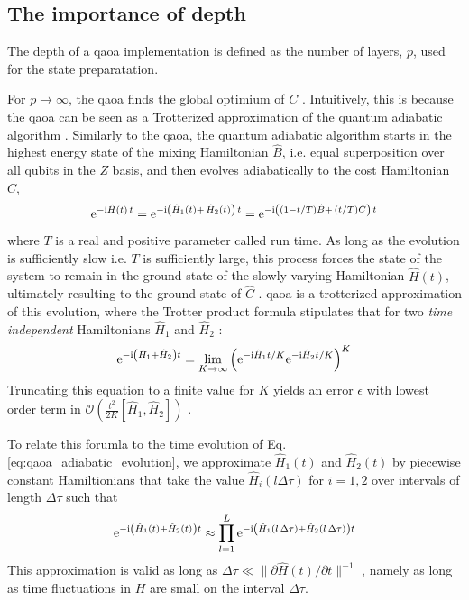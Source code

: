 \subsection{The importance of depth}
The depth of a \gls{qaoa} implementation is defined as the number of layers, $p$, used for the state preparatation.

For $p \rightarrow \infty$, the \gls{qaoa} finds the global optimium of $C$ \cite{Farhi2014AAlgorithm}. Intuitively, this is because the \gls{qaoa} can be seen as a Trotterized approximation \cite{TrotterMathematics} of the quantum adiabatic algorithm \cite{Farhi2000QuantumEvolution}. Similarly to the \gls{qaoa}, the quantum adiabatic algorithm starts in the highest energy state of the mixing Hamiltonian $\hat B$, i.e. equal superposition over all qubits in the $Z$ basis, and then evolves adiabatically to the cost Hamiltonian $\hat C$,
\begin{equation} \label{eq:qaoa_adiabatic_evolution}
\mathrm e^{-\mathrm i \hat H(t)\,t}= \mathrm e^{-\mathrm i \left(\hat H_1(t) +\, \hat H_2(t)\right) \, t} = \mathrm e^{-\mathrm i \left((1-t / T) \hat B+ \, (t / T) \hat C\right)\, t}
\end{equation}
where $T$ is a real and positive parameter called run time. As long as the evolution is sufficiently slow i.e. $T$ is sufficiently large, this process forces the state of the system to remain in the ground state of the slowly varying Hamiltonian $\hat H(t)$, ultimately resulting to the ground state of $\hat C$ \cite{Farhi2000QuantumEvolution, Farhi2014AAlgorithm}. \gls{qaoa} is a trotterized approximation of this evolution, where the Trotter product formula stipulates that for two \textit{time independent} Hamiltonians $\hat H_1$ and $\hat H_2$ \cite{TrotterMathematics}:
\begin{equation} \label{eq:qaoa_product_formula}
    \mathrm e^{-\mathrm i\left(\hat H_{1} + \hat H_{2}\right) t}=\lim _{K \rightarrow \infty}\left(\mathrm e^{-\mathrm i \hat H_{1} t / K} \mathrm e^{-\mathrm i \hat H_{2} t / K}\right)^{K}
\end{equation}
Truncating this equation to a finite value for  $K$ yields an error $\epsilon$ with lowest order term in $\mathcal{O}\left(\frac{t^2}{2K} [\hat H_1, \hat H_2]\right)$ \cite{Heyl2018QuantumSimulation, Lloyd1996UniversalSimulators}.

To relate this forumla to the time evolution of Eq. \eqref{eq:qaoa_adiabatic_evolution}, we approximate $\hat H_1(t)$ and $\hat H_2(t)$ by piecewise constant Hamiltionians that take the value $\hat H_i(l\Delta \tau)$ for $i = 1,2$ over intervals of length $\Delta \tau$ such that
\begin{equation} \label{eq:qaoa_discretization}
    \mathrm e^{-\mathrm i\left(\hat H_{1}(t) + \hat H_{2}(t)\right) t} \approx \prod_{l = 1}^L \mathrm e^{-\mathrm i\left(\hat H_{1}(l\,\Delta \tau) + \hat H_{2}(l\,\Delta \tau)\right) t}
\end{equation}
This approximation is valid as long as $\Delta \tau \ll\|\partial \hat H(t) / \partial t\|^{-1}$ \cite{Poulin2011QuantumSpace}, namely as long as time fluctuations in $H$ are small on the interval $\Delta \tau$.


